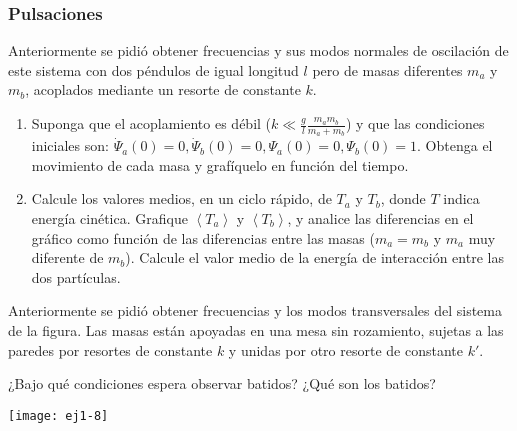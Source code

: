 \subsubsection*{Pulsaciones}



\item \label{pendacop}
\begin{minipage}[t][2.2cm]{0.75\textwidth}
Anteriormente se pidió obtener frecuencias y sus modos normales de oscilación de este sistema con dos péndulos de igual longitud $l$ pero de masas diferentes $m_{a}$ y $m_{b}$, acoplados mediante un resorte de constante $k$.
\end{minipage}
\begin{minipage}[c][3cm][t]{0.2\textwidth}
	\begingroup
		
	\endgroup
\end{minipage}
\begin{enumerate}
	\item Suponga que el acoplamiento es débil ($k\ll\frac{g}{l}\frac{m_{a}m_{b}}{m_{a}+m_{b}}$) y que las condiciones iniciales son: $\dot{\Psi}_{a}(0)=0,\dot{\Psi}_{b}(0)=0,\Psi_{a}(0)=0,\Psi_{b}(0)=1$.
Obtenga el movimiento de cada masa y grafíquelo en función del tiempo.
	\item Calcule los valores medios, en un ciclo rápido, de $T_{a}$ y $T_{b}$, donde $T$ indica energía cinética.
	Grafique $\left\langle T_{a}\right\rangle $ y $\left\langle T_{b}\right\rangle $, y analice las diferencias en el gráfico como función de las diferencias entre las masas ($m_{a}=m_{b}$ y $m_{a}$ muy diferente de $m_{b}$).
	Calcule el valor medio de la energía de interacción entre las dos partículas.
\end{enumerate}



\item \label{2masitas}
\begin{minipage}[t][2.8cm]{0.7\textwidth}
Anteriormente se pidió obtener frecuencias y los modos transversales del sistema de la figura.
Las masas están apoyadas en una mesa sin rozamiento, sujetas a las paredes por resortes de constante $k$ y unidas por otro resorte de constante $k'$.

¿Bajo qué condiciones espera observar batidos?
¿Qué son los batidos?
\end{minipage}
\begin{minipage}[c][0cm][t]{0.25\textwidth}
  \texttt{[image: ej1-8]}
\end{minipage}


